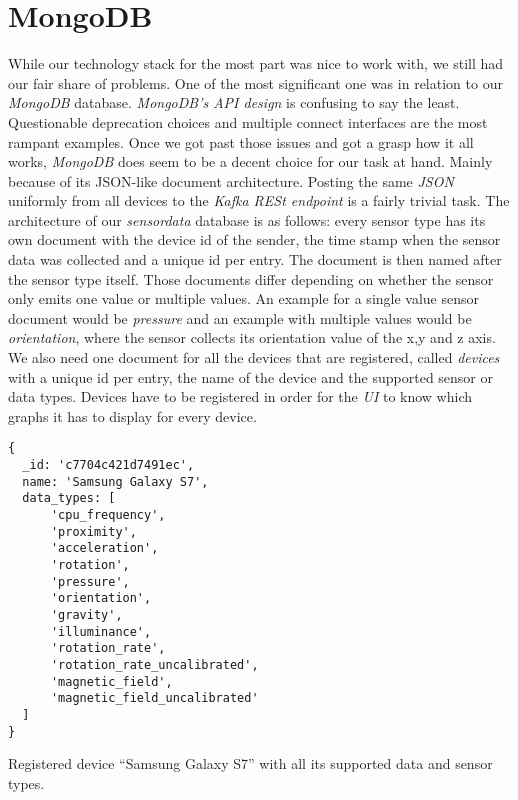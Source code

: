\section{MongoDB}

While our technology stack for the most part was nice to work with, we still had our fair share of
problems. One of the most significant one was in relation to our \textit{MongoDB} database.
\textit{MongoDB’s API design} is confusing to say the least. Questionable deprecation choices and
multiple connect interfaces are the most rampant examples. Once we got past those issues and got a
grasp how it all works, \textit{MongoDB} does seem to be a decent choice for our task at hand.
Mainly because of its JSON-like document architecture. Posting the same \textit{JSON} uniformly from
all devices to the \textit{Kafka RESt endpoint} is a fairly trivial task. The architecture of our
\textit{sensordata} database is as follows: every sensor type has its own document with the device
id of the sender, the time stamp when the sensor data was collected and a unique id per entry. The
document is then named after the sensor type itself. Those documents differ depending on whether the
sensor only emits one value or multiple values. An example for a single value sensor document would
be \textit{pressure} and an example with multiple values would be \textit{orientation}, where the
sensor collects its orientation value of the x,y and z axis. We also need one document for all the
devices that are registered, called \textit{devices} with a unique id per entry, the name of the
device and the supported sensor or data types. Devices have to be registered in order for the
\textit{UI} to know which graphs it has to display for every device.

\begin{code}[H]
  \centering
  \begin{lstlisting}[language=mongo]
{
  _id: 'c7704c421d7491ec',
  name: 'Samsung Galaxy S7',
  data_types: [
      'cpu_frequency',
      'proximity',
      'acceleration',
      'rotation',
      'pressure',
      'orientation',
      'gravity',
      'illuminance',
      'rotation_rate',
      'rotation_rate_uncalibrated',
      'magnetic_field',
      'magnetic_field_uncalibrated'
  ]
}
  \end{lstlisting}
  \caption{Registered device “Samsung Galaxy S7” with all its supported data and sensor types.}
\end{code}
